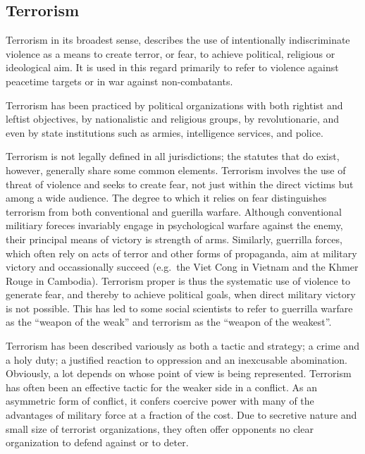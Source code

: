 \documentclass[
  openany]{book}
\begin{document}
\hypertarget{terrorism}{%
\subsection{Terrorism}\label{terrorism}}

Terrorism in its broadest sense, describes the use of intentionally indiscriminate violence as a means to create terror, or fear, to achieve political, religious or ideological aim. It is used in this regard primarily to refer to violence against peacetime targets or in war against non-combatants.

Terrorism has been practiced by political organizations with both rightist and leftist objectives, by nationalistic and religious groups, by revolutionarie, and even by state institutions such as armies, intelligence services, and police.

Terrorism is not legally defined in all jurisdictions; the statutes that do exist, however, generally share some common elements. Terrorism involves the use of threat of violence and seeks to create fear, not just within the direct victims but among a wide audience. The degree to which it relies on fear distinguishes terrorism from both conventional and guerilla warfare. Although conventional militiary foreces invariably engage in psychological warfare against the enemy, their principal means of victory is strength of arms. Similarly, guerrilla forces, which often rely on acts of terror and other forms of propaganda, aim at military victory and occassionally succeed (e.g.~the Viet Cong in Vietnam and the Khmer Rouge in Cambodia). Terrorism proper is thus the systematic use of violence to generate fear, and thereby to achieve political goals, when direct military victory is not possible. This has led to some social scientists to refer to guerrilla warfare as the ``weapon of the weak'' and terrorism as the ``weapon of the weakest''.

Terrorism has been described variously as both a tactic and strategy; a crime and a holy duty; a justified reaction to oppression and an inexcusable abomination. Obviously, a lot depends on whose point of view is being represented. Terrorism has often been an effective tactic for the weaker side in a conflict. As an asymmetric form of conflict, it confers coercive power with many of the advantages of military force at a fraction of the cost. Due to secretive nature and small size of terrorist organizations, they often offer opponents no clear organization to defend against or to deter.
\end{document}
